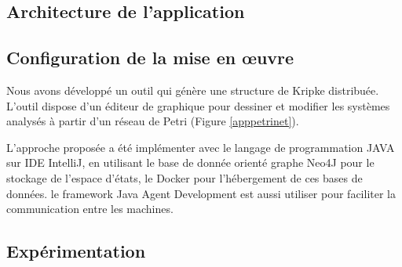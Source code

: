 \subsection{Architecture de l'application}

\subsection{Configuration de la mise en œuvre}
Nous avons développé un outil qui génère une structure de Kripke distribuée. L’outil dispose d’un éditeur de graphique pour dessiner et modifier les systèmes analysés à partir d'un réseau de Petri (Figure \ref{apppetrinet}).

L’approche proposée a été implémenter avec le langage de programmation JAVA sur IDE IntelliJ, en utilisant le base de donnée orienté graphe Neo4J pour le stockage de l'espace d'états, le Docker pour l'hébergement de ces bases de données. le framework Java Agent Development est aussi utiliser pour faciliter la communication entre les machines.

\subsection{Expérimentation}